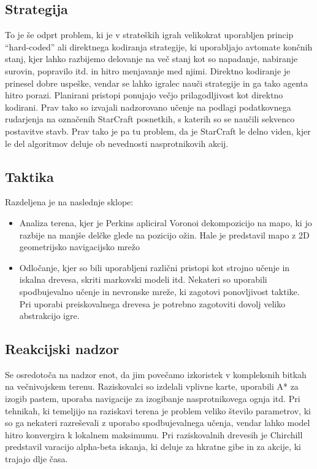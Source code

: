 \documentclass[a4paper, 12pt]{book}
\begin{document}
\subsection{Strategija}
To je še odprt problem, ki je v strateških igrah velikokrat uporabljen princip “hard-coded” ali direktnega kodiranja strategije, ki uporabljajo avtomate končnih stanj, kjer lahko razbijemo delovanje na več stanj kot so napadanje, nabiranje surovin, popravilo itd. in hitro menjavanje med njimi. Direktno kodiranje je prinesel dobre uspeške, vendar se lahko igralec nauči strategije in ga tako agenta hitro porazi.
Planirani pristopi ponujajo večjo prilagodljivost kot direktno kodirani.
Prav tako so izvajali nadzorovano učenje na podlagi podatkovnega rudarjenja na označenih StarCraft posnetkih, s katerih so se naučili sekvenco postavitve stavb.
Prav tako je pa tu problem, da je StarCraft le delno viden, kjer le del algoritmov deluje ob nevednosti nasprotnikovih akcij.
\subsection{Taktika}
Razdeljena je na naslednje sklope:
\begin{itemize}
\item Analiza terena, kjer je Perkins apliciral Voronoi dekompozicijo na mapo, ki jo razbije na manjše delčke glede na pozicijo ožin.
	Hale je predstavil mapo z 2D geometrijsko navigacijsko mrežo
\item Odločanje, kjer so bili uporabljeni različni pristopi kot strojno učenje in iskalna drevesa, skriti markovski modeli itd.
	Nekateri so uporabili spodbujevalno učenje in nevronske mreže, ki zagotovi ponovljivost taktike.
	Pri uporabi preiskovalnega drevesa je potrebno zagotoviti dovolj veliko abstrakcijo igre.
\end{itemize}

\subsection{Reakcijski nadzor}
Se osredotoča na nadzor enot, da jim povečamo izkoristek v kompleksnih bitkah na večnivojskem terenu.
Raziskovalci so izdelali vplivne karte, uporabili A* za izogib pastem, uporaba navigacije za izogibanje nasprotnikovega ognja itd.
Pri tehnikah, ki temeljijo na raziskavi terena je problem veliko število parametrov, ki so ga nekateri razreševali z uporabo spodbujevalnega učenja, vendar lahko model hitro konvergira k lokalnem maksimumu.
Pri raziskovalnih drevesih je Chirchill predstavil varacijo alpha-beta iskanja, ki deluje za hkratne gibe in za akcije, ki trajajo dlje časa.
\end{document}
